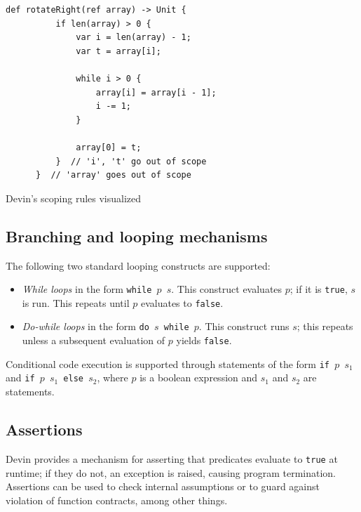 \documentclass[UdineBachThesis,american,11pt]{PhdThesis}
\begin{document}
  \begin{Listing}[H]
    \begin{Verbatim}[gobble=6,fontsize=\small]
      def rotateRight(ref array) -> Unit {
          if len(array) > 0 {
              var i = len(array) - 1;
              var t = array[i];

              while i > 0 {
                  array[i] = array[i - 1];
                  i -= 1;
              }

              array[0] = t;
          }  // 'i', 't' go out of scope
      }  // 'array' goes out of scope
    \end{Verbatim}
    \vspace{\prevdepth-\depthof{\strut}}

    \caption{Devin's scoping rules visualized}
  \end{Listing}

  \subsection{Branching and looping mechanisms}

  The following two standard looping constructs are supported:

  \begin{itemize}
    \item \emph{While loops} in the form \mbox{\texttt{while $p$ $s$}}. This
    construct evaluates $p$; if it is \mbox{\texttt{true}}, $s$ is run. This
    repeats until $p$ evaluates to \mbox{\texttt{false}}.

    \item \emph{Do-while loops} in the form \mbox{\texttt{do $s$ while $p$}}.
    This construct runs $s$; this repeats unless a subsequent evaluation of $p$
    yields \mbox{\texttt{false}}.
  \end{itemize}

  Conditional code execution is supported through statements of the form
  \mbox{\texttt{if $p$ $s_1$}} and \mbox{\texttt{if $p$ $s_1$ else $s_2$}},
  where $p$ is a boolean expression and $s_1$ and $s_2$ are statements.

  \subsection{Assertions}

  Devin provides a mechanism for asserting that predicates evaluate to
  \mbox{\texttt{true}} at runtime; if they do not, an exception is raised,
  causing program termination. Assertions can be used to check internal
  assumptions or to guard against violation of function contracts, among other
  things.
\end{document}
